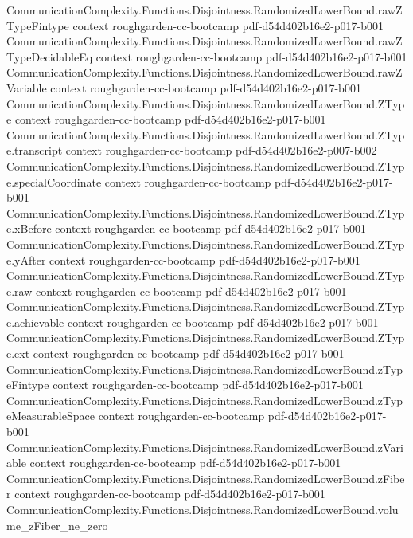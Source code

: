 \begin{theorem}
\proofstep
  {CommunicationComplexity.Functions.Disjointness.RandomizedLowerBound.rawZTypeFintype}
  {context}
  {roughgarden-cc-bootcamp}
  {pdf-d54d402b16e2-p017-b001}
\proofstep
  {CommunicationComplexity.Functions.Disjointness.RandomizedLowerBound.rawZTypeDecidableEq}
  {context}
  {roughgarden-cc-bootcamp}
  {pdf-d54d402b16e2-p017-b001}
\proofstep
  {CommunicationComplexity.Functions.Disjointness.RandomizedLowerBound.rawZVariable}
  {context}
  {roughgarden-cc-bootcamp}
  {pdf-d54d402b16e2-p017-b001}
\proofstep
  {CommunicationComplexity.Functions.Disjointness.RandomizedLowerBound.ZType}
  {context}
  {roughgarden-cc-bootcamp}
  {pdf-d54d402b16e2-p017-b001}
\proofstep
  {CommunicationComplexity.Functions.Disjointness.RandomizedLowerBound.ZType.transcript}
  {context}
  {roughgarden-cc-bootcamp}
  {pdf-d54d402b16e2-p007-b002}
\proofstep
  {CommunicationComplexity.Functions.Disjointness.RandomizedLowerBound.ZType.specialCoordinate}
  {context}
  {roughgarden-cc-bootcamp}
  {pdf-d54d402b16e2-p017-b001}
\proofstep
  {CommunicationComplexity.Functions.Disjointness.RandomizedLowerBound.ZType.xBefore}
  {context}
  {roughgarden-cc-bootcamp}
  {pdf-d54d402b16e2-p017-b001}
\proofstep
  {CommunicationComplexity.Functions.Disjointness.RandomizedLowerBound.ZType.yAfter}
  {context}
  {roughgarden-cc-bootcamp}
  {pdf-d54d402b16e2-p017-b001}
\proofstep
  {CommunicationComplexity.Functions.Disjointness.RandomizedLowerBound.ZType.raw}
  {context}
  {roughgarden-cc-bootcamp}
  {pdf-d54d402b16e2-p017-b001}
\proofstep
  {CommunicationComplexity.Functions.Disjointness.RandomizedLowerBound.ZType.achievable}
  {context}
  {roughgarden-cc-bootcamp}
  {pdf-d54d402b16e2-p017-b001}
\proofstep
  {CommunicationComplexity.Functions.Disjointness.RandomizedLowerBound.ZType.ext}
  {context}
  {roughgarden-cc-bootcamp}
  {pdf-d54d402b16e2-p017-b001}
\proofstep
  {CommunicationComplexity.Functions.Disjointness.RandomizedLowerBound.zTypeFintype}
  {context}
  {roughgarden-cc-bootcamp}
  {pdf-d54d402b16e2-p017-b001}
\proofstep
  {CommunicationComplexity.Functions.Disjointness.RandomizedLowerBound.zTypeMeasurableSpace}
  {context}
  {roughgarden-cc-bootcamp}
  {pdf-d54d402b16e2-p017-b001}
\proofstep
  {CommunicationComplexity.Functions.Disjointness.RandomizedLowerBound.zVariable}
  {context}
  {roughgarden-cc-bootcamp}
  {pdf-d54d402b16e2-p017-b001}
\proofstep
  {CommunicationComplexity.Functions.Disjointness.RandomizedLowerBound.zFiber}
  {context}
  {roughgarden-cc-bootcamp}
  {pdf-d54d402b16e2-p017-b001}
\proofstep
  {CommunicationComplexity.Functions.Disjointness.RandomizedLowerBound.volume_zFiber_ne_zero}

\end{theorem}
